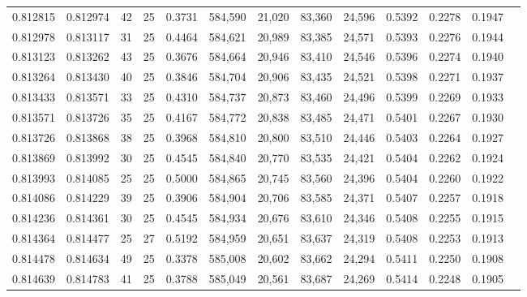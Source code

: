 \begin{tabular}{rrrrrrrrrrrrr}
0.812815 & 0.812974 &    42 &  25 &                                     0.3731 & 584,590 &  21,020 &  83,360 &  24,596 & 0.5392 & 0.2278 & 0.1947 \\
0.812978 & 0.813117 &    31 &  25 &                                     0.4464 & 584,621 &  20,989 &  83,385 &  24,571 & 0.5393 & 0.2276 & 0.1944 \\
0.813123 & 0.813262 &    43 &  25 &                                     0.3676 & 584,664 &  20,946 &  83,410 &  24,546 & 0.5396 & 0.2274 & 0.1940 \\
0.813264 & 0.813430 &    40 &  25 &                                     0.3846 & 584,704 &  20,906 &  83,435 &  24,521 & 0.5398 & 0.2271 & 0.1937 \\
0.813433 & 0.813571 &    33 &  25 &                                     0.4310 & 584,737 &  20,873 &  83,460 &  24,496 & 0.5399 & 0.2269 & 0.1933 \\
0.813571 & 0.813726 &    35 &  25 &                                     0.4167 & 584,772 &  20,838 &  83,485 &  24,471 & 0.5401 & 0.2267 & 0.1930 \\
0.813726 & 0.813868 &    38 &  25 &                                     0.3968 & 584,810 &  20,800 &  83,510 &  24,446 & 0.5403 & 0.2264 & 0.1927 \\
0.813869 & 0.813992 &    30 &  25 &                                     0.4545 & 584,840 &  20,770 &  83,535 &  24,421 & 0.5404 & 0.2262 & 0.1924 \\
0.813993 & 0.814085 &    25 &  25 &                                     0.5000 & 584,865 &  20,745 &  83,560 &  24,396 & 0.5404 & 0.2260 & 0.1922 \\
0.814086 & 0.814229 &    39 &  25 &                                     0.3906 & 584,904 &  20,706 &  83,585 &  24,371 & 0.5407 & 0.2257 & 0.1918 \\
0.814236 & 0.814361 &    30 &  25 &                                     0.4545 & 584,934 &  20,676 &  83,610 &  24,346 & 0.5408 & 0.2255 & 0.1915 \\
0.814364 & 0.814477 &    25 &  27 &                                     0.5192 & 584,959 &  20,651 &  83,637 &  24,319 & 0.5408 & 0.2253 & 0.1913 \\
0.814478 & 0.814634 &    49 &  25 &                                     0.3378 & 585,008 &  20,602 &  83,662 &  24,294 & 0.5411 & 0.2250 & 0.1908 \\
0.814639 & 0.814783 &    41 &  25 &                                     0.3788 & 585,049 &  20,561 &  83,687 &  24,269 & 0.5414 & 0.2248 & 0.1905 \\

\end{tabular}

